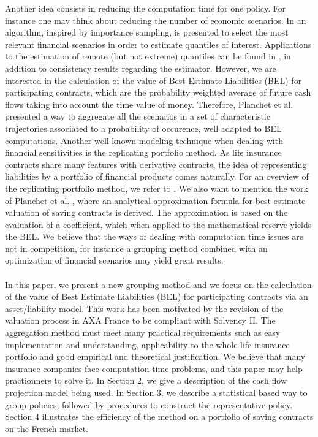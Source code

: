 Another idea consists in reducing the computation time for one policy. For instance one may think about reducing the number of economic scenarios. In \citet{DeLo09} an algorithm, inspired by importance sampling, is presented to select the most relevant financial scenarios in order to estimate quantiles of interest. Applications to the estimation of remote (but not extreme) quantiles can be found in \citet{ChDeLoMD11}, in addition to consistency results regarding the estimator. However, we are interested in the calculation of the value of Best Estimate Liabilities (BEL) for participating contracts, which are the probability weighted average of future cash flows taking into account the time value of money. Therefore, Planchet et al. \citet{NtPl12} presented a way to aggregate all the scenarios in a set of characteristic trajectories associated to a probability of occurence, well adapted to BEL computations. Another well-known modeling technique when dealing with financial sensitivities is the replicating portfolio method. As life insurance contracts share many features with derivative contracts, the idea of representing liabilities by a portfolio of financial products comes naturally. For an overview of the replicating portfolio method, we refer to \citet{Sc08,DeCh11}. We also want to mention the work of Planchet et al. \citet{BoPlJu12}, where an analytical approximation formula for best estimate valuation of saving contracts is derived. The approximation is based on the evaluation of a coefficient, which when applied to the mathematical reserve yields the BEL. We believe that the ways of dealing with computation time issues are not in competition, for instance a grouping method combined with an optimization of financial scenarios may yield great results.\\
\\
In this paper, we present a new grouping method and we focus on the calculation of the value of Best Estimate Liabilities (BEL) for participating contracts via an asset/liability model. This work has been motivated by the revision of the valuation process in AXA France to be compliant with Solvency II. The aggregation method must meet many practical requirements such as easy implementation and understanding, applicability to the whole life insurance portfolio and good empirical and theoretical justification. We believe that many insurance companies face computation time problems, and this paper may help practionners to solve it. In Section 2, we give a description of the cash flow projection model being used. In Section 3, we describe a statistical based way to group policies, followed by procedures to construct the representative policy. Section 4 illustrates the efficiency of the method on a portfolio of saving contracts on the French market.
